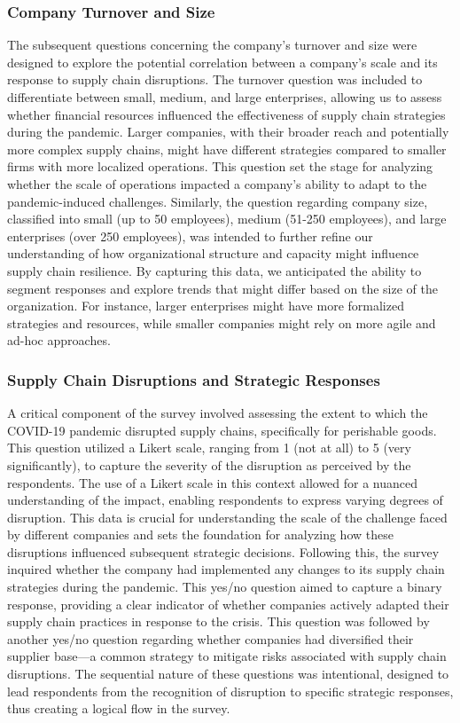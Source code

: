 \subsubsection*{Company Turnover and Size}
The subsequent questions concerning the company’s turnover and size were designed to explore the potential correlation between a company’s scale and its response to supply chain disruptions. The turnover question was included to differentiate between small, medium, and large enterprises, allowing us to assess whether financial resources influenced the effectiveness of supply chain strategies during the pandemic. Larger companies, with their broader reach and potentially more complex supply chains, might have different strategies compared to smaller firms with more localized operations. This question set the stage for analyzing whether the scale of operations impacted a company’s ability to adapt to the pandemic-induced challenges. Similarly, the question regarding company size, classified into small (up to 50 employees), medium (51-250 employees), and large enterprises (over 250 employees), was intended to further refine our understanding of how organizational structure and capacity might influence supply chain resilience. By capturing this data, we anticipated the ability to segment responses and explore trends that might differ based on the size of the organization. For instance, larger enterprises might have more formalized strategies and resources, while smaller companies might rely on more agile and ad-hoc approaches.

\subsubsection*{Supply Chain Disruptions and Strategic Responses}
A critical component of the survey involved assessing the extent to which the COVID-19 pandemic disrupted supply chains, specifically for perishable goods. This question utilized a Likert scale, ranging from 1 (not at all) to 5 (very significantly), to capture the severity of the disruption as perceived by the respondents. The use of a Likert scale in this context allowed for a nuanced understanding of the impact, enabling respondents to express varying degrees of disruption. This data is crucial for understanding the scale of the challenge faced by different companies and sets the foundation for analyzing how these disruptions influenced subsequent strategic decisions. Following this, the survey inquired whether the company had implemented any changes to its supply chain strategies during the pandemic. This yes/no question aimed to capture a binary response, providing a clear indicator of whether companies actively adapted their supply chain practices in response to the crisis. This question was followed by another yes/no question regarding whether companies had diversified their supplier base—a common strategy to mitigate risks associated with supply chain disruptions. The sequential nature of these questions was intentional, designed to lead respondents from the recognition of disruption to specific strategic responses, thus creating a logical flow in the survey.

